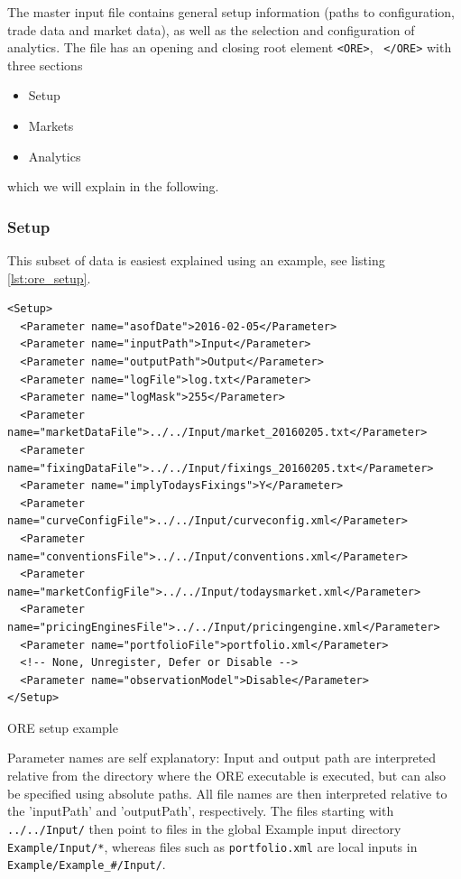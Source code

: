 \documentclass[12pt, a4paper]{article}
\begin{document}
The master input file contains general setup information (paths to configuration, trade data and market data), as well
as the selection and configuration of analytics. The file has an opening and closing root element {\tt <ORE>}, {\tt
  </ORE>} with three sections
\begin{itemize}
\item Setup
\item Markets
\item Analytics
\end{itemize}
which we will explain in the following.

\subsubsection{Setup}

This subset of data is easiest explained using an example, see listing \ref{lst:ore_setup}.
\begin{listing}[H]
\begin{verbatim}
<Setup>
  <Parameter name="asofDate">2016-02-05</Parameter>
  <Parameter name="inputPath">Input</Parameter>
  <Parameter name="outputPath">Output</Parameter>
  <Parameter name="logFile">log.txt</Parameter>
  <Parameter name="logMask">255</Parameter>
  <Parameter name="marketDataFile">../../Input/market_20160205.txt</Parameter>
  <Parameter name="fixingDataFile">../../Input/fixings_20160205.txt</Parameter>
  <Parameter name="implyTodaysFixings">Y</Parameter>
  <Parameter name="curveConfigFile">../../Input/curveconfig.xml</Parameter>
  <Parameter name="conventionsFile">../../Input/conventions.xml</Parameter>
  <Parameter name="marketConfigFile">../../Input/todaysmarket.xml</Parameter>
  <Parameter name="pricingEnginesFile">../../Input/pricingengine.xml</Parameter>
  <Parameter name="portfolioFile">portfolio.xml</Parameter>
  <!-- None, Unregister, Defer or Disable -->
  <Parameter name="observationModel">Disable</Parameter>
</Setup>
\end{verbatim}
\caption{ORE setup example}
\label{lst:ore_setup}
\end{listing}

Parameter names are self explanatory: Input and output path are interpreted relative from the directory where the ORE
executable is executed, but can also be specified using absolute paths. All file names are then interpreted relative to the
'inputPath' and 'outputPath', respectively. The files starting with {\tt ../../Input/} then point to files in the global
Example input directory {\tt Example/Input/*}, whereas files such as {\tt portfolio.xml} are local inputs in {\tt 
Example/Example\_\#/Input/}. 
\end{document}
